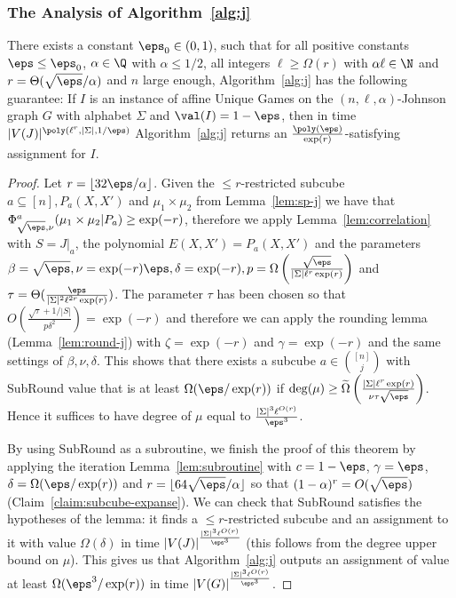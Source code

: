 \subsubsection{The Analysis of Algorithm~\ref{alg:j}}\label{sec:combine_analysis}

\begin{theorem}\label{thm:main-johnson}
There exists a constant $\eps_0 \in (0,1)$, such that for all positive constants $\eps \leq \eps_0$, $\alpha \in \Q$ with $\alpha \leq 1/2$, all integers $\ell \geq \Omega(r)$ with $\alpha \ell \in \N$ and $r = \Theta(\sqrt{\eps}/\alpha)$ and $n$ large enough, Algorithm~\ref{alg:j} has the following guarantee: If $I$ is an instance of affine Unique Games on the $(n,\ell,\alpha)$-Johnson graph $G$ with alphabet $\Sigma$ and $\val(I) = 1 - \eps$, then in time $|V(J)|^{\poly(\ell^r,|\Sigma|,1/\eps)}$ 
Algorithm~\ref{alg:j} returns an $\frac{\poly(\eps)}{\exp(r)}$-satisfying assignment for $I$.
\end{theorem}

\begin{proof}
Let $r = \lfloor 32\eps/\alpha\rfloor$. Given the $\leq r$-restricted subcube $a \subseteq [n], P_a(X,X')$ and $\mu_1 \times \mu_2$ from Lemma~\ref{lem:sp-j} we have that $\Phi_{\sqrt{\eps},\nu}^a(\mu_1 \times \mu_2| P_a) \geq \exp(-r)$, therefore we apply Lemma~\ref{lem:correlation} with $S = J|_a$, the polynomial  $E(X,X') = P_a(X,X')$ and the parameters $\beta = \sqrt{\eps}, \nu = \exp(-r)\eps, \delta = \exp(-r), p = \Omega\left(\frac{\sqrt{\eps}}{|\Sigma|\ell^{r}\exp(r)}\right)$ and $\tau = \Theta(\frac{\eps}{|\Sigma|^2\ell^{2r}\exp(r)})$. The parameter $\tau$ has been chosen so that $O(\frac{\sqrt{\tau}+1/|S|}{p\delta^2}) = \exp(-r)$ and therefore we can apply the rounding lemma (Lemma~\ref{lem:round-j}) with $\zeta = \exp(-r)$ and $\gamma = \exp(-r)$ and the same settings of $\beta, \nu, \delta$. This shows that there exists a subcube $a \in {[n] \choose j}$ with SubRound value that is at least $\Omega(\eps/\exp(r))$ if $\deg(\mu) \geq \widetilde{\Omega}\left(\frac{|\Sigma|\ell^r\exp(r)}{\nu\tau\sqrt{\eps}}\right)$. Hence it suffices to have degree of $\mu$ equal to $\frac{|\Sigma|^3\ell^{O(r)}}{\eps^3}$.

By using SubRound as a subroutine, we finish the proof of this theorem by applying the iteration Lemma~\ref{lem:subroutine} with $c=1-\eps$, $\gamma = \eps$, $\delta = \Omega(\eps/\exp(r))$ and $r = \lfloor 64\sqrt{\eps}/\alpha \rfloor$ so that $(1-\alpha)^r = O(\sqrt{\eps})$ (Claim~\ref{claim:subcube-expanse}). We can check that SubRound satisfies the hypotheses of the lemma: it finds a $\le r$-restricted subcube and an assignment to it with value $\Omega(\delta)$ in time $|V(J)|^{\frac{|\Sigma|^3\ell^{O(r)}}{\eps^3}}$ (this follows from the degree upper bound on $\mu$).
This gives us that Algorithm~\ref{alg:j} outputs an assignment of value at least $\Omega(\eps^3/\exp(r))$ in time $|V(G)|^{\frac{|\Sigma|^3\ell^{O(r)}}{\eps^3}}$.
\end{proof}



